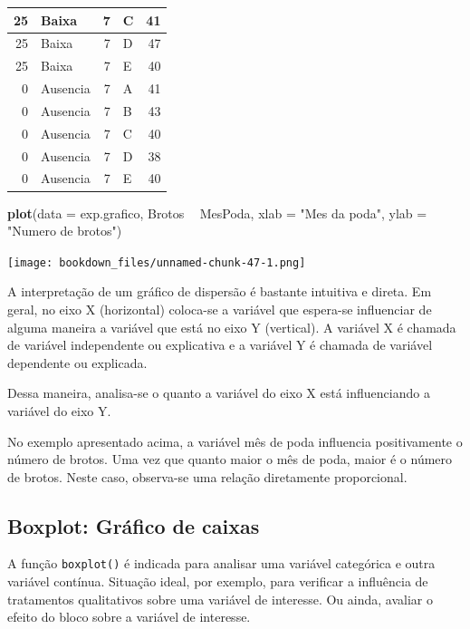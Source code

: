 \documentclass[
]{article}
\newenvironment{Shaded}{\begin{snugshade}}{\end{snugshade}}
\newcommand{\DataTypeTok}[1]{\textcolor[rgb]{0.13,0.29,0.53}{#1}}
\newcommand{\KeywordTok}[1]{\textcolor[rgb]{0.13,0.29,0.53}{\textbf{#1}}}
\newcommand{\NormalTok}[1]{#1}
\newcommand{\OperatorTok}[1]{\textcolor[rgb]{0.81,0.36,0.00}{\textbf{#1}}}
\newcommand{\StringTok}[1]{\textcolor[rgb]{0.31,0.60,0.02}{#1}}
\begin{document}
\begin{table}
\begin{tabular}[t]{r|l|r|l|r}
\hline
25 & Baixa & 7 & C & 41\\
\hline
25 & Baixa & 7 & D & 47\\
\hline
25 & Baixa & 7 & E & 40\\
\hline
0 & Ausencia & 7 & A & 41\\
\hline
0 & Ausencia & 7 & B & 43\\
\hline
0 & Ausencia & 7 & C & 40\\
\hline
0 & Ausencia & 7 & D & 38\\
\hline
0 & Ausencia & 7 & E & 40\\
\hline
\end{tabular}
\end{table}

\begin{Shaded}
\begin{Highlighting}[]
\KeywordTok{plot}\NormalTok{(}\DataTypeTok{data =}\NormalTok{ exp.grafico, Brotos }\OperatorTok{~}\StringTok{ }\NormalTok{MesPoda, }
     \DataTypeTok{xlab =} \StringTok{"Mes da poda"}\NormalTok{, }
     \DataTypeTok{ylab =} \StringTok{"Numero de brotos"}\NormalTok{)}
\end{Highlighting}
\end{Shaded}

\texttt{[image: bookdown\_files/unnamed-chunk-47-1.png]}

A interpretação de um gráfico de dispersão é bastante intuitiva e direta. Em geral, no eixo X (horizontal) coloca-se a variável que espera-se influenciar de alguma maneira a variável que está no eixo Y (vertical). A variável X é chamada de variável independente ou explicativa e a variável Y é chamada de variável dependente ou explicada.

Dessa maneira, analisa-se o quanto a variável do eixo X está influenciando a variável do eixo Y.

No exemplo apresentado acima, a variável mês de poda influencia positivamente o número de brotos. Uma vez que quanto maior o mês de poda, maior é o número de brotos. Neste caso, observa-se uma relação diretamente proporcional.

\hypertarget{boxplot-gruxe1fico-de-caixas}{%
\subsection{Boxplot: Gráfico de caixas}\label{boxplot-gruxe1fico-de-caixas}}

A função \texttt{boxplot()} é indicada para analisar uma variável categórica e outra variável contínua. Situação ideal, por exemplo, para verificar a influência de tratamentos qualitativos sobre uma variável de interesse. Ou ainda, avaliar o efeito do bloco sobre a variável de interesse.
\end{document}

